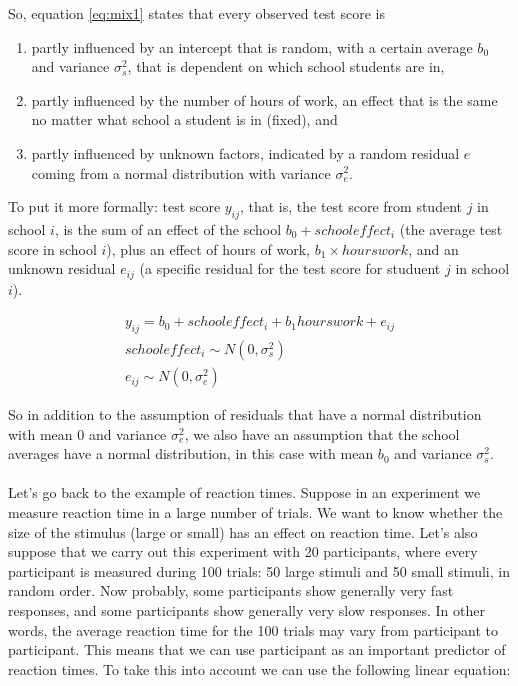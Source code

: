 \documentclass[]{book}\usepackage[]{graphicx}\usepackage[]{color}
\begin{document}
So, equation \ref{eq:mix1} states that every observed test score is 

\begin{enumerate}
\item partly influenced by an intercept that is random, with a certain average $b_0$ and variance $\sigma_s^2$, that is dependent on which school students are in, 
\item partly influenced by the number of hours of work, an effect that is the same no matter what school a student is in (fixed), and
\item partly influenced by unknown factors, indicated by a random residual $e$ coming from a normal distribution with variance $\sigma^2_e$.
\end{enumerate}

To put it more formally: test score $y_{ij}$, that is, the test score from student $j$ in school $i$, is the sum of an effect of the school $b_0 + schooleffect_i$ (the average test score in school $i$), plus an effect of hours of work,  $b_1 \times hourswork$, and an unknown residual $e_{ij}$ (a specific residual for the test score for studuent $j$ in school $i$).

\begin{eqnarray}
y_{ij} = b_0 + schooleffect_i + b_1 hourswork + e_{ij} \\
schooleffect_i \sim N(0, \sigma_s^2)\\
e_{ij} \sim N(0, \sigma_e^2)
\end{eqnarray}

So in addition to the assumption of residuals that have a normal distribution with mean 0 and variance $\sigma_e^2$, we also have an assumption that the school averages have a normal distribution, in this case with mean $b_0$ and variance $\sigma_s^2$.
\\
\\
Let's go back to the example of reaction times. Suppose in an experiment we measure reaction time in a large number of trials. We want to know whether the size of the stimulus (large or small) has an effect on reaction time. Let's also suppose that we carry out this experiment with 20 participants, where every participant is measured during 100 trials: 50 large stimuli and 50 small stimuli, in random order. Now probably, some participants show generally very fast responses, and some participants show generally very slow responses. In other words, the average reaction time for the 100 trials may vary from participant to participant. This means that we can use participant as an important predictor of reaction times. To take this into account we can use the following linear equation:
\end{document}
